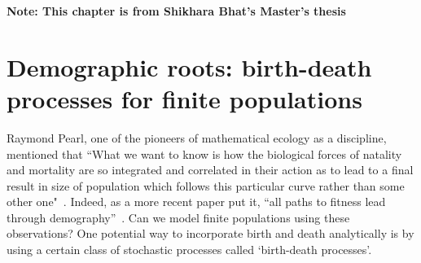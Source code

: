 \textbf{Note: This chapter is from Shikhara Bhat's Master's thesis~\citep{bhat_thesis_2023}}

\chapter{Demographic roots: birth-death processes for finite populations}

Raymond Pearl, one of the pioneers of mathematical ecology as a discipline, mentioned that ``What we want to know is how the biological forces of natality and mortality are so integrated and correlated in their action as to lead to a final result in size of population which follows this particular curve rather than some other one"~\citep{pearl_growth_1976}. Indeed, as a more recent paper put it, ``all paths to fitness lead through demography''~\citep{metcalf_all_2007}. Can we model finite populations using these observations? One potential way to incorporate birth and death analytically is by using a certain class of stochastic processes called `birth-death processes'. 

